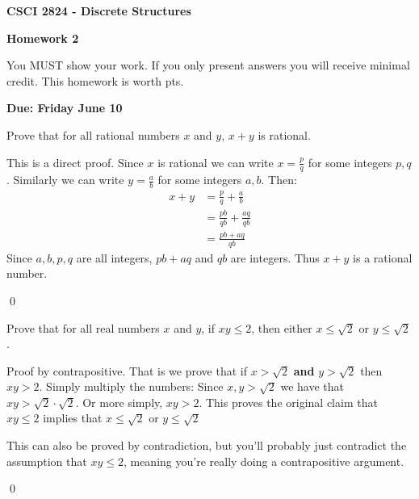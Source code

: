 \documentclass[addpoints,answers]{exam}
\begin{document}
\singlespacing

\begin{center}
  {\large\textbf{CSCI 2824 - Discrete Structures}}

  {\large\textbf{Homework 2}}
\end{center}

You MUST show your work. If you only present answers you will receive minimal credit. This homework is worth \numpoints pts.

\textbf{Due: Friday June 10}

\begin{questions}
  \question[2]\label{qn:1} Prove that for all rational numbers $x$ and $y$, $x+y$ is rational.
    \vspace*{\fill}

    \begin{solution}
      This is a direct proof. Since $x$ is rational we can write $x = \frac pq$ for some integers $p,q$. Similarly we can write $y = \frac ab$ for some integers $a,b$. Then:
      \begin{align*}
        x + y &= \frac pq + \frac ab\\
        &= \frac{pb}{qb} + \frac{aq}{qb}\\
        &= \frac{pb + aq}{qb}
      \end{align*}
      Since $a,b,p,q$ are all integers, $pb +aq$ and $qb$ are integers. Thus $x+y$ is a rational number.

      \qed
    \end{solution}

  \question[4] Prove that for all real numbers $x$ and $y$, if $xy \leq 2$, then either $x\leq \sqrt{2}$ or $y \leq \sqrt{2}$.
    \vspace*{\fill}

    \begin{solution}
      Proof by contrapositive. That is we prove that if $x > \sqrt{2}$ \textbf{and} $y > \sqrt{2}$ then $xy > 2$. Simply multiply the numbers: Since $x,y > \sqrt{2}$ we have that $xy>\sqrt{2}\cdot\sqrt{2}$. Or more simply, $xy > 2$. This proves the original claim that $xy \leq 2$ implies that $x \leq \sqrt{2}$ or $y\leq \sqrt{2}$

      This can also be proved by contradiction, but you'll probably just contradict the assumption that $xy \leq 2$, meaning you're really doing a contrapositive argument.

      \qed
    \end{solution}


\end{questions}
\end{document}
